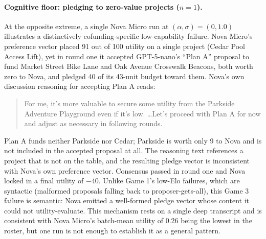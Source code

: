 \paragraph{Cognitive floor: pledging to zero-value projects ($n = 1$).} At the opposite extreme, a single Nova Micro run at $(\alpha, \sigma) = (0, 1.0)$ illustrates a distinctively cofunding-specific low-capability failure. Nova Micro's preference vector placed 91 out of 100 utility on a single project (Cedar Pool Access Lift), yet in round one it accepted GPT-5-nano's ``Plan A'' proposal to fund Market Street Bike Lane and Oak Avenue Crosswalk Beacons, both worth zero to Nova, and pledged 40 of its 43-unit budget toward them. Nova's own discussion reasoning for accepting Plan A reads:
\begin{quote}
For me, it's more valuable to secure some utility from the Parkside Adventure Playground even if it's low. \ldots Let's proceed with Plan A for now and adjust as necessary in following rounds.
\end{quote}
Plan A funds neither Parkside nor Cedar; Parkside is worth only 9 to Nova and is not included in the accepted proposal at all. The reasoning text references a project that is not on the table, and the resulting pledge vector is inconsistent with Nova's own preference vector. Consensus passed in round one and Nova locked in a final utility of $-40$. Unlike Game 1's low-Elo failures, which are syntactic (malformed proposals falling back to proposer-gets-all), this Game 3 failure is semantic: Nova emitted a well-formed pledge vector whose content it could not utility-evaluate. This mechanism rests on a single deep transcript and is consistent with Nova Micro's batch-mean utility of 0.26 being the lowest in the roster, but one run is not enough to establish it as a general pattern.


